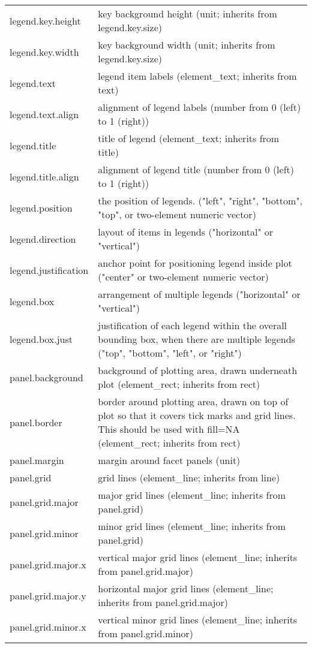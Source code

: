 \begin{table}[ht]
\begin{tabular}{ll}
  legend.key.height & key background height (unit; inherits from legend.key.size) \\ 
  legend.key.width & key background width (unit; inherits from legend.key.size) \\ 
  legend.text & legend item labels (element\_text; inherits from text) \\ 
  legend.text.align & alignment of legend labels (number from 0 (left) to 1 (right)) \\ 
  legend.title & title of legend (element\_text; inherits from title) \\ 
  legend.title.align & alignment of legend title (number from 0 (left) to 1 (right)) \\ 
  legend.position & the position of legends. ("left", "right", "bottom", "top", or two-element numeric vector) \\ 
  legend.direction & layout of items in legends ("horizontal" or "vertical") \\ 
  legend.justification & anchor point for positioning legend inside plot ("center" or two-element numeric vector) \\ 
  legend.box & arrangement of multiple legends ("horizontal" or "vertical") \\ 
  legend.box.just & justification of each legend within the overall bounding box, when there are multiple legends ("top", "bottom", "left", or "right") \\ 
  panel.background & background of plotting area, drawn underneath plot (element\_rect; inherits from rect) \\ 
  panel.border & border around plotting area, drawn on top of plot so that it covers tick marks and grid lines. This should be used with fill=NA (element\_rect; inherits from rect) \\ 
  panel.margin & margin around facet panels (unit) \\ 
  panel.grid & grid lines (element\_line; inherits from line) \\ 
  panel.grid.major & major grid lines (element\_line; inherits from panel.grid) \\ 
  panel.grid.minor & minor grid lines (element\_line; inherits from panel.grid) \\ 
  panel.grid.major.x & vertical major grid lines (element\_line; inherits from panel.grid.major) \\ 
  panel.grid.major.y & horizontal major grid lines (element\_line; inherits from panel.grid.major) \\ 
  panel.grid.minor.x & vertical minor grid lines (element\_line; inherits from panel.grid.minor) \\ 

\end{tabular}
\end{table}
